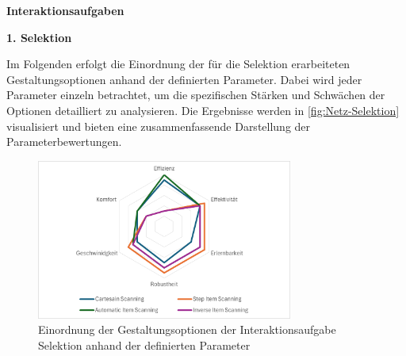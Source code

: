 {\normalfont \bfseries Interaktionsaufgaben}  

\textbf{1. Selektion}

Im Folgenden erfolgt die Einordnung der für die Selektion erarbeiteten Gestaltungsoptionen anhand der definierten Parameter. Dabei wird jeder Parameter einzeln betrachtet, um die spezifischen Stärken und Schwächen der Optionen detailliert zu analysieren. Die Ergebnisse werden in \autoref{fig:Netz-Selektion} visualisiert und bieten eine zusammenfassende Darstellung der Parameterbewertungen.

\begin{figure}[tbh]
    \centering
    \includegraphics[width=0.75\textwidth]{images/Netzdiagramm-Selektion.png}
    \caption{Einordnung der Gestaltungsoptionen der Interaktionsaufgabe Selektion anhand der definierten Parameter}
    \label{fig:Netz-Selektion}
\end{figure}

